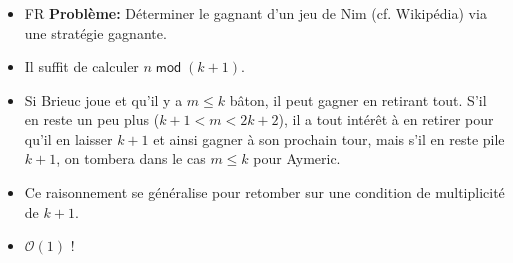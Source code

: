 \begin{frame}
    \frametitle{\problemtitle}
    \begin{itemize}
        \item<+-> FR \textbf{Problème:} Déterminer le gagnant d'un jeu de Nim (cf. Wikipédia) via une stratégie gagnante.
        \item<+-> Il suffit de calculer $n\;\mathsf{mod}\; (k + 1)$.
        \item<+-> Si Brieuc joue et qu'il y a $m \le k$ bâton, il peut gagner en retirant tout. S'il en reste un peu plus ($k+1<m<2k+2$), il a tout intérêt à en retirer pour qu'il en laisser $k+1$ et ainsi gagner à son prochain tour, mais s'il en reste pile $k+1$, on tombera dans le cas $m\le k$ pour Aymeric.
        \item<+-> Ce raisonnement se généralise pour retomber sur une condition de multiplicité de $k+1$.
        \item<+-> $\mathcal O(1)$ !
    \end{itemize}
    \solvestats
\end{frame}

